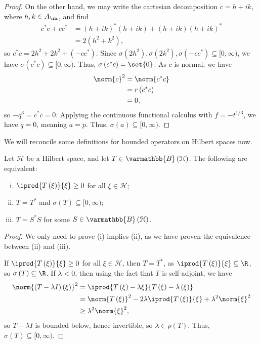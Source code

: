 \documentclass[10pt]{mypackage}
\renewcommand*{\mathbb}[1]{\varmathbb{#1}}
\newcommand{\B}{\mathbb{B}}
\begin{document}
\begin{proof}
  On the other hand, we may write the cartesian decomposition $c = h + ik$, where $h,k\in A_{\sa}$, and find
  \begin{align*}
    c^{\ast}c + cc^{\ast} &= \left(h + ik\right)^{\ast}\left(h+ik\right) + \left(h+ik\right)\left(h+ik\right)^{\ast}\\
                          &= 2\left(h^2 + k^2\right),
  \end{align*}
  so $c^{\ast}c = 2h^2 + 2k^2 + \left(-cc^{\ast}\right)$. Since $\sigma\left(2h^2\right),\sigma\left(2k^2\right),\sigma\left(-cc^{\ast}\right)\subseteq [0,\infty)$, we have $\sigma\left(c^{\ast}c\right)\subseteq [0,\infty)$. Thus, $\sigma\left(c^{\ast}c\right) = \set{0}$. As $c$ is normal, we have
  \begin{align*}
    \norm{c}^2 &= \norm{c^{\ast}c}\\
               &= r\left(c^{\ast}c\right)\\
               &= 0,
  \end{align*}
  so $-q^3 = c^{\ast}c = 0$. Applying the continuous functional calculus with $f = -t^{1/3}$, we have $q = 0$, meaning $a = p$. Thus, $\sigma\left(a\right)\subseteq [0,\infty)$.
\end{proof}
We will reconcile some definitions for bounded operators on Hilbert spaces now.
\begin{proposition}
  Let $\mathcal{H}$ be a Hilbert space, and let $T\in \B\left(\mathcal{H}\right)$. The following are equivalent:
  \begin{enumerate}[(i)]
    \item $ \iprod{T\left(\xi\right)}{\xi} \geq 0$ for all $\xi\in \mathcal{H}$;
    \item $T = T^{\ast}$ and $\sigma\left(T\right) \subseteq [0,\infty)$;
    \item $T = S^{\ast}S$ for some $S\in \B\left(\mathcal{H}\right)$.
  \end{enumerate}
\end{proposition}
\begin{proof}
  We only need to prove (i) implies (ii), as we have proven the equivalence between (ii) and (iii).\newline

  If $ \iprod{T\left(\xi\right)}{\xi} \geq 0 $ for all $\xi\in \mathcal{H}$, then $T = T^{\ast}$, as $ \iprod{T\left(\xi\right)}{\xi}\subseteq \R $, so $\sigma\left(T\right)\subseteq \R$. If $\lambda < 0$, then using the fact that $T$ is self-adjoint, we have
  \begin{align*}
    \norm{\left(T- \lambda I\right)\left(\xi\right)}^2 &= \iprod{T\left(\xi\right) - \lambda\xi}{T\left(\xi\right) - \lambda\left(\xi\right)}\\
                                                       &= \norm{T\left(\xi\right)}^2 - 2\lambda \iprod{T\left(\xi\right)}{\xi} + \lambda^2\norm{\xi}^2\\
                                                       &\geq \lambda^2\norm{\xi}^2,
  \end{align*}
  so $T - \lambda I$ is bounded below, hence invertible, so $\lambda\in\rho\left(T\right)$. Thus, $\sigma\left(T\right)\subseteq[0,\infty)$.
\end{proof}
\end{document}
